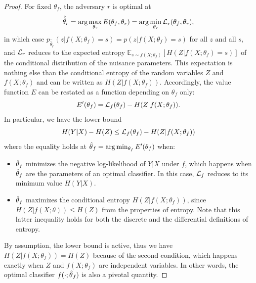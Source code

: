 \documentclass{article}
\theoremstyle{plain}
\begin{document}
\begin{proof}

For fixed $\theta_f$, the adversary $r$ is optimal at
\begin{equation}
    \hat{\hat\theta}_r = \arg \max_{\theta_r} E(\theta_f, \theta_r)  = \arg \min_{\theta_r} {\cal L}_r(\theta_f, \theta_r),
\end{equation}
in which case $p_{\hat{\hat\theta}_r}(z|f(X;\theta_f)=s) =
p(z|f(X;\theta_f)=s)$ for all $z$ and all $s$, and ${\cal L}_r$ reduces to the expected entropy
$\mathbb{E}_{s \sim f(X;\theta_f)} [ H({Z|f(X;\theta_f)=s}) ]$ of the conditional distribution of the nuisance parameters.
This expectation is nothing else than the conditional entropy of the random variables
$Z$ and $f(X;\theta_f)$ and can be written as $H(Z|f(X;\theta_f))$.
Accordingly, the
value function $E$ can be restated as a function depending on $\theta_f$ only:
\begin{equation}
    E'(\theta_f) = {\cal L}_f(\theta_f) -  H({Z|f(X;\theta_f)}).
\end{equation}
In particular, we have the lower bound
\begin{equation}
    H({Y|X}) - H(Z) \leq {\cal L}_f(\theta_f) - H({Z|f(X;\theta_f)})
\end{equation}
where the equality holds at $\smash{\hat\theta}_f = \arg \min_{\theta_f}
E'(\theta_f)$  when:
\begin{itemize}
    \item $\smash{\hat\theta}_f$ minimizes the negative log-likelihood of $Y|X$ under $f$,
    which happens when $\smash{\hat\theta}_f$ are the parameters
    of an optimal classifier. In this case, ${\cal L}_f$ reduces to its
    minimum value $H({Y|X})$.

    \item $\smash{\hat\theta}_f$ maximizes the conditional entropy
    $H({Z|f(X;\theta_f)})$, since $H(Z|f(X;\theta)) \leq H(Z)$ from the properties of entropy. Note that this
    latter inequality holds for both the discrete and the differential definitions of entropy.
\end{itemize}
By assumption, the lower bound is active, thus we have $H(Z|f(X;\theta_f)) = H(Z)$
because of the second condition, which happens exactly when $Z$ and $f(X;\theta_f)$
are independent variables. In other words,  the
optimal classifier $f(\cdot;\smash{\hat\theta}_f)$ is also a pivotal
quantity.
\end{proof}
\end{document}
